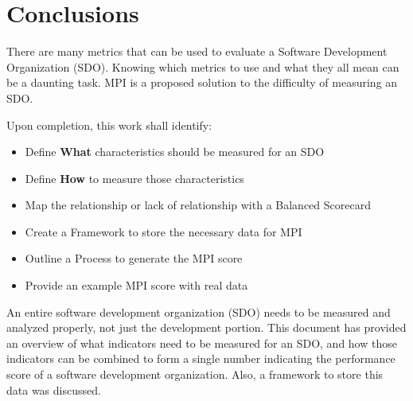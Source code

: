 \documentclass[SDSUThesis.tex]{subfiles}
\begin{document}
\section{Conclusions}

There are many metrics that can be used to evaluate a Software Development Organization (SDO). 
Knowing which metrics to use and what they all mean can be a daunting task.  MPI is a
proposed solution to the difficulty of measuring an SDO.

Upon completion, this work shall identify:
\begin{itemize}
    \item Define \textbf{What} characteristics should be measured for an SDO
    \item Define \textbf{How} to measure those characteristics
    \item Map the relationship or lack of relationship with a Balanced Scorecard
    \item Create a Framework to store the necessary data for MPI
    \item Outline a Process to generate the MPI score
    \item Provide an example MPI score with real data
\end{itemize}

An entire software development organization (SDO) needs to be measured and analyzed properly, not just the development portion. This document has provided an overview of what indicators need to be measured for an SDO, and how those indicators can be combined to form a single number indicating the performance score of a software development organization.  Also, a framework to store this data was discussed.
\end{document}

